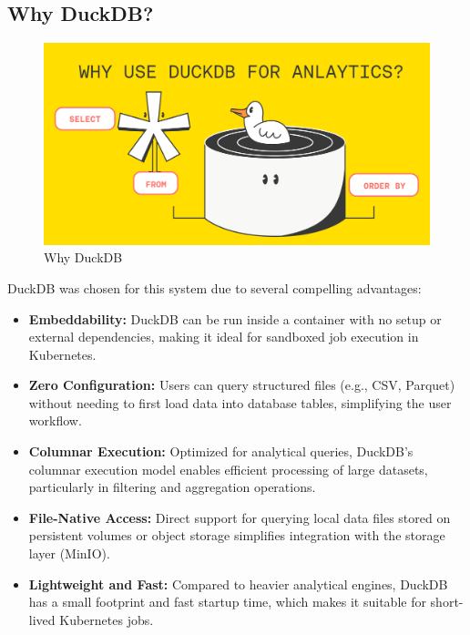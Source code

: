 \subsection*{Why DuckDB?}

\begin{figure}[h!]
  \centering
  \includegraphics[width=1\textwidth]{Images/duckdb_for_analytics_1_c16a0acfc3.png}
  \caption{Why DuckDB}
  \label{fig:duckdb}
\end{figure}

DuckDB was chosen for this system due to several compelling advantages:

\begin{itemize}
    \item \textbf{Embeddability:} DuckDB can be run inside a container with no setup or external dependencies, making it ideal for 
    sandboxed job execution in Kubernetes.
    
    \item \textbf{Zero Configuration:} Users can query structured files (e.g., CSV, Parquet) without needing to first load data 
    into database tables, simplifying the user workflow.
    
    \item \textbf{Columnar Execution:} Optimized for analytical queries, DuckDB's columnar execution model enables efficient 
    processing of large datasets, particularly in filtering and aggregation operations.
    
    \item \textbf{File-Native Access:} Direct support for querying local data files stored on persistent volumes or object 
    storage simplifies integration with the storage layer (MinIO).
    
    \item \textbf{Lightweight and Fast:} Compared to heavier analytical engines, DuckDB has a small footprint and fast startup time, 
    which makes it suitable for short-lived Kubernetes jobs.
\end{itemize}

